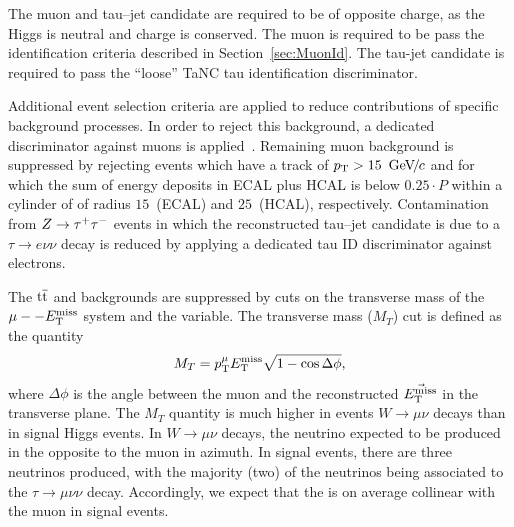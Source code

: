 The muon and tau--jet candidate are required to be of opposite charge, as the
Higgs is neutral and charge is conserved.  The muon is required to be pass the
identification criteria described in Section~\ref{sec:MuonId}.   The tau-jet
candidate is required to pass the ``loose'' TaNC tau identification discriminator. 

Additional event selection criteria are applied to reduce contributions of
specific background processes. In order to reject this background, a dedicated
discriminator against muons is applied~\cite{CMS-PAS-PFT-08-001}. Remaining muon
background is suppressed by rejecting events which have a track of $p_{\mathrm{T}} >
15~{\,\text{Ge\hspace{-.08em}V\hspace{-0.16em}/\hspace{-0.08em}}c}$ and for which the sum of energy deposits in ECAL plus HCAL is below
$0.25 \cdot P$ within a cylinder of of radius $15$~\centi\meter (ECAL) and
$25$~\centi\meter (HCAL), respectively.  
Contamination from $Z \to \tau^+\tau^-$ events in which the
reconstructed tau--jet candidate is due to a $\tau \to e \nu \nu$ decay is
reduced by applying a dedicated tau ID discriminator against electrons.

The $\mathrm{t}\overline{\mathrm{t}}$ and \WpJets backgrounds
are suppressed by cuts on the transverse mass of the $\mu--E_{\mathrm{T}}^{\text{miss}}$ system and the
\Pzeta variable.  The transverse mass ($M_T$) cut is defined as the quantity
\begin{equation}
  M_T = p_{\mathrm{T}}^\mu E_{\mathrm{T}}^{\text{miss}} \sqrt{1 - \cos \Delta\phi},
\end{equation}
where $\Delta\phi$ is the angle between the muon and the reconstructed
$\vec{E_{\mathrm{T}}^{\text{miss}}}$ in the transverse plane.  The $M_T$ quantity is much higher in
events $W \to \mu \nu$ decays than in signal Higgs events.  In $W \to \mu \nu$
decays, the neutrino expected to be produced in the opposite to the muon in
azimuth.  In signal events, there are three neutrinos produced, with the
majority (two) of the neutrinos being associated to the $\tau \to \mu \nu \nu$
decay.  Accordingly, we expect that the \MET is on average collinear with the
muon in signal events.

